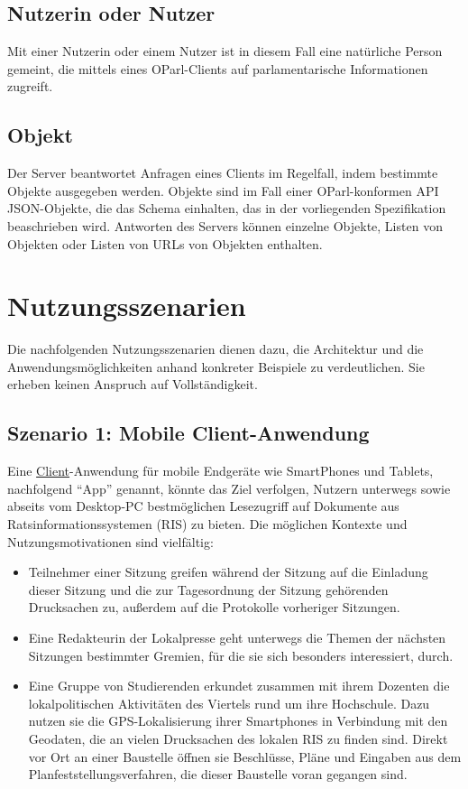\documentclass[,a4paper]{article}
\begin{document}
\subsection{Nutzerin oder Nutzer}\label{nutzerin-oder-nutzer}

Mit einer Nutzerin oder einem Nutzer ist in diesem Fall eine natürliche
Person gemeint, die mittels eines OParl-Clients auf parlamentarische
Informationen zugreift.

\subsection{Objekt}\label{objekt}

Der Server beantwortet Anfragen eines Clients im Regelfall, indem
bestimmte Objekte ausgegeben werden. Objekte sind im Fall einer
OParl-konformen API JSON-Objekte, die das Schema einhalten, das in der
vorliegenden Spezifikation beaschrieben wird. Antworten des Servers
können einzelne Objekte, Listen von Objekten oder Listen von URLs von
Objekten enthalten.

\section{Nutzungsszenarien}\label{nutzungsszenarien}

Die nachfolgenden Nutzungsszenarien dienen dazu, die Architektur und die
Anwendungsmöglichkeiten anhand konkreter Beispiele zu verdeutlichen. Sie
erheben keinen Anspruch auf Vollständigkeit.

\subsection{Szenario 1: Mobile
Client-Anwendung}\label{szenarioux5fmobileux5fclient}

Eine \hyperref[client]{Client}-Anwendung für mobile Endgeräte wie
SmartPhones und Tablets, nachfolgend ``App'' genannt, könnte das Ziel
verfolgen, Nutzern unterwegs sowie abseits vom Desktop-PC bestmöglichen
Lesezugriff auf Dokumente aus Ratsinformationssystemen (RIS) zu bieten.
Die möglichen Kontexte und Nutzungsmotivationen sind vielfältig:

\begin{itemize}
\item
  Teilnehmer einer Sitzung greifen während der Sitzung auf die Einladung
  dieser Sitzung und die zur Tagesordnung der Sitzung gehörenden
  Drucksachen zu, außerdem auf die Protokolle vorheriger Sitzungen.
\item
  Eine Redakteurin der Lokalpresse geht unterwegs die Themen der
  nächsten Sitzungen bestimmter Gremien, für die sie sich besonders
  interessiert, durch.
\item
  Eine Gruppe von Studierenden erkundet zusammen mit ihrem Dozenten die
  lokalpolitischen Aktivitäten des Viertels rund um ihre Hochschule.
  Dazu nutzen sie die GPS-Lokalisierung ihrer Smartphones in Verbindung
  mit den Geodaten, die an vielen Drucksachen des lokalen RIS zu finden
  sind. Direkt vor Ort an einer Baustelle öffnen sie Beschlüsse, Pläne
  und Eingaben aus dem Planfeststellungsverfahren, die dieser Baustelle
  voran gegangen sind.
\end{itemize}
\end{document}
